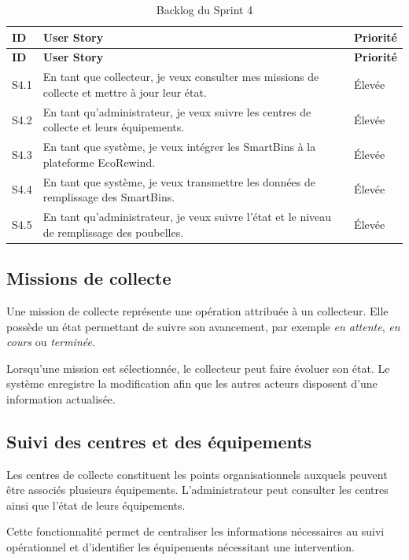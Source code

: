 {\begin{longtable}{|>{\centering\arraybackslash}p{1cm}|p{9.3cm}|>{\centering\arraybackslash}p{2cm}|}
\caption{Backlog du Sprint 4}
\label{tab:r2_s4_backlog}
\\ \hline
\rowcolor{gray!25}
\textbf{ID} & \textbf{User Story} & \textbf{Priorité}
\\ \hline
\endfirsthead
\hline
\rowcolor{gray!25}
\textbf{ID} & \textbf{User Story} & \textbf{Priorité}
\\ \hline
S4.1 & En tant que collecteur, je veux consulter mes missions de collecte et mettre à jour leur état. & Élevée \\ \hline
S4.2 & En tant qu'administrateur, je veux suivre les centres de collecte et leurs équipements. & Élevée \\ \hline
S4.3 & En tant que système, je veux intégrer les SmartBins à la plateforme EcoRewind. & Élevée \\ \hline
S4.4 & En tant que système, je veux transmettre les données de remplissage des SmartBins. & Élevée \\ \hline
S4.5 & En tant qu'administrateur, je veux suivre l'état et le niveau de remplissage des poubelles. & Élevée \\ \hline
\end{longtable}

\subsection{Missions de collecte}

Une mission de collecte représente une opération attribuée à un collecteur. Elle possède un état permettant de suivre son avancement, par exemple \textit{en attente}, \textit{en cours} ou \textit{terminée}.

Lorsqu'une mission est sélectionnée, le collecteur peut faire évoluer son état. Le système enregistre la modification afin que les autres acteurs disposent d'une information actualisée.

\subsection{Suivi des centres et des équipements}

Les centres de collecte constituent les points organisationnels auxquels peuvent être associés plusieurs équipements. L'administrateur peut consulter les centres ainsi que l'état de leurs équipements.

Cette fonctionnalité permet de centraliser les informations nécessaires au suivi opérationnel et d'identifier les équipements nécessitant une intervention.

}
